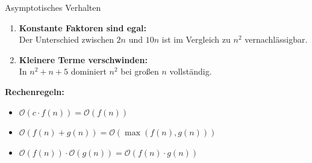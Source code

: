 \documentclass[aspectratio=169,11pt]{beamer}
\begin{document}
\begin{frame}{Asymptotisches Verhalten}
    \begin{tcolorbox}[successbox, title=Wichtige Erkenntnisse für große $n$]
        \begin{enumerate}
            \item \textbf{Konstante Faktoren sind egal:} \\ Der Unterschied zwischen $2n$ und $10n$ ist im Vergleich zu $n^2$ vernachlässigbar.
            \item \textbf{Kleinere Terme verschwinden:} \\ In $n^2 + n + 5$ dominiert $n^2$ bei großen $n$ vollständig.
        \end{enumerate}
    \end{tcolorbox}
    
    \textbf{Rechenregeln:}
    \begin{itemize}
        \item $\mathcal{O}(c \cdot f(n)) = \mathcal{O}(f(n))$
        \item $\mathcal{O}(f(n) + g(n)) = \mathcal{O}(\max(f(n), g(n)))$
        \item $\mathcal{O}(f(n)) \cdot \mathcal{O}(g(n)) = \mathcal{O}(f(n) \cdot g(n))$
    \end{itemize}
\end{frame}
\end{document}
